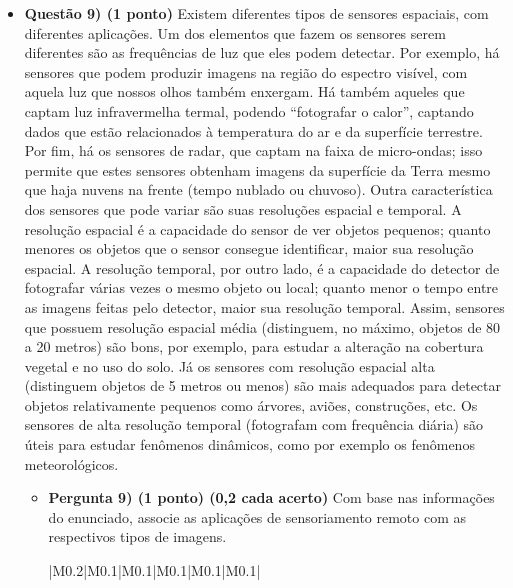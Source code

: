 \documentclass[a4paper, 12pt]{article}
\begin{document}
\begin{flushleft}
\begin{itemize}
        \item \textbf{Questão 9) (1 ponto)} Existem diferentes tipos de sensores espaciais, com diferentes aplicações. \linebreak \linebreak Um dos elementos que fazem os sensores serem diferentes são as frequências de luz que eles podem detectar. Por exemplo, há sensores que podem produzir imagens na região do espectro visível, com aquela luz que nossos olhos também enxergam. Há também aqueles que captam luz infravermelha termal, podendo “fotografar o calor”, captando dados que estão relacionados à temperatura do ar e da superfície terrestre. Por fim, há os sensores de radar, que captam na faixa de micro-ondas; isso permite que estes sensores obtenham imagens da superfície da Terra mesmo que haja nuvens na frente (tempo nublado ou chuvoso). \linebreak \linebreak Outra característica dos sensores que pode variar são suas resoluções espacial e temporal. A resolução espacial é a capacidade do sensor de ver objetos pequenos; quanto menores os objetos que o sensor consegue identificar, maior sua resolução espacial. A resolução temporal, por outro lado, é a capacidade do detector de fotografar várias vezes o mesmo objeto ou local; quanto menor o tempo entre as imagens feitas pelo detector, maior sua resolução temporal. \linebreak \linebreak Assim, sensores que possuem resolução espacial média (distinguem, no máximo, objetos de 80 a 20 metros) são bons, por exemplo, para estudar a alteração na cobertura vegetal e no uso do solo. Já os sensores com resolução espacial alta (distinguem objetos de 5 metros ou menos) são mais adequados para detectar objetos relativamente pequenos como árvores, aviões, construções, etc. Os sensores de alta resolução temporal (fotografam com frequência diária) são úteis para estudar fenômenos dinâmicos, como por exemplo os fenômenos meteorológicos.
            \begin{itemize}
                \item \textbf{Pergunta 9) (1 ponto) (0,2 cada acerto)} Com base nas informações do enunciado, associe as aplicações de sensoriamento remoto com as respectivos tipos de imagens.
                    \begin{center} \begin{tabular}
                    {
                        |M{0.2\textwidth}|M{0.1\textwidth}|M{0.1\textwidth}|M{0.1\textwidth}|M{0.1\textwidth}|M{0.1\textwidth}|
}
\end{tabular}
\end{center}
\end{itemize}
\end{itemize}
\end{flushleft}
\end{document}
